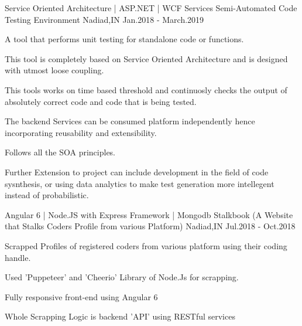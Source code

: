 


\begin{cventries}


\cventry
{Service Oriented Architecture | ASP.NET | WCF Services} %
{Semi-Automated Code Testing Environment} %
{Nadiad,IN} %
{Jan.2018 - March.2019} %
{ %
\begin{cvitems}
\item {A tool that performs unit testing for standalone code or functions.}
\item {This tool is completely based on Service Oriented Architecture and is designed with utmost loose coupling.}
\item {This tools works on time based threshold and continuosly checks the output of absolutely correct code and code that is being tested.}
\item {The backend Services can be consumed platform independently hence incorporating reusability and extensibility.}
\item {Follows all the SOA principles.}
\item {Further Extension to project can include development in the field of code sysnthesis, or using data analytics to make test generation more intellegent instead of probabilistic.}
\end{cvitems}
}


\cventry
{Angular 6 | Node.JS with Express Framework | Mongodb} %
{Stalkbook (A Website that Stalks Coders Profile from various Platform)} %
{Nadiad,IN} %
{Jul.2018 - Oct.2018} %
{ %
\begin{cvitems}
\item {Scrapped Profiles of registered coders from various platform using their coding handle.}
\item {Used 'Puppeteer' and 'Cheerio' Library of Node.Js for scrapping.}
\item {Fully responsive front-end using Angular 6}
\item {Whole Scrapping Logic is backend 'API' using RESTful services}
\end{cvitems}
}


\end{cventries}
